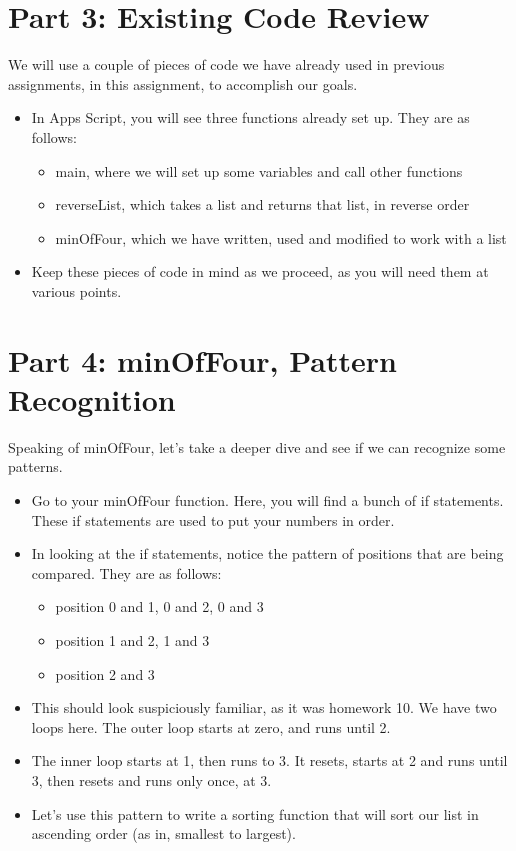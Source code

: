 \documentclass{article}
\begin{document}
\section*{Part 3: Existing Code Review}
We will use a couple of pieces of code we have already used in previous assignments, in this assignment, to accomplish our goals.
\begin{itemize}
    \item In Apps Script, you will see three functions already set up.  They are as follows:
    \begin{itemize}
    		\item main, where we will set up some variables and call other functions
    		\item reverseList, which takes a list and returns that list, in reverse order
    		\item minOfFour, which we have written, used and modified to work with a list
    	\end{itemize}
    	\item Keep these pieces of code in mind as we proceed, as you will need them at various points.
\end{itemize}

\section*{Part 4: minOfFour, Pattern Recognition}
Speaking of minOfFour, let's take a deeper dive and see if we can recognize some patterns.
\begin{itemize}
    \item Go to your minOfFour function.  Here, you will find a bunch of if statements.  These if statements are used to put your numbers in order.
    \item In looking at the if statements, notice the pattern of positions that are being compared.  They are as follows:
    \begin{itemize}
    		\item position 0 and 1, 0 and 2, 0 and 3
    		\item position 1 and 2, 1 and 3
    		\item position 2 and 3
    	\end{itemize}
    	\item This should look suspiciously familiar, as it was homework 10.  We have two loops here.  The outer loop starts at zero, and runs until 2.
    	\item The inner loop starts at 1, then runs to 3.  It resets, starts at 2 and runs until 3, then resets and runs only once, at 3.
    	\item Let's use this pattern to write a sorting function that will sort our list in ascending order (as in, smallest to largest).
\end{itemize}
\end{document}
